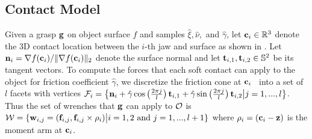 \subsection{Contact Model}
Given a grasp $\mathbf{g}$ on object surface $f$ and samples $\hat{\xi}, \hat{\nu},$ and $\hat{\gamma}$, let $\mathbf{c}_i \in \mathbb{R}^3$ denote the 3D contact location between the $i$-th jaw and surface as shown in .
Let $\mathbf{n}_i = \nabla f(\mathbf{c}_i) / \| \nabla f(\mathbf{c}_i) \|_2$ denote the surface normal and let $\mathbf{t}_{i,1}, \mathbf{t}_{i,2} \in \mathbb{S}^2$ be its tangent vectors.
To compute the forces that each soft contact can apply to the object for friction coefficient $\hat{\gamma}$, we discretize the friction cone at $\mathbf{c}_i$~\cite{pokorny2013c} into a set of $l$ facets with vertices $\mathcal{F}_{i} = \left\{ \mathbf{n}_i + \hat{\gamma} \cos \left( \frac{2 \pi j}{l} \right) \mathbf{t}_{i,1} + \hat{\gamma} \sin \left( \frac{2 \pi j}{l} \right) \mathbf{t}_{i,2} \big| j = 1, ..., l \right\}$.
Thus the set of wrenches that $\mathbf{g}$ can apply to $\mathcal{O}$ is $\mathcal{W} = \{ \mathbf{w}_{i,j} = (\mathbf{f}_{i,j}, \mathbf{f}_{i,j} \times \rho_i) \big| i = 1, 2 \text{ and } j = 1, ..., l+1\}$ where $\rho_i = (\mathbf{c}_i - \mathbf{z})$ is the moment arm at $\mathbf{c}_i$.

